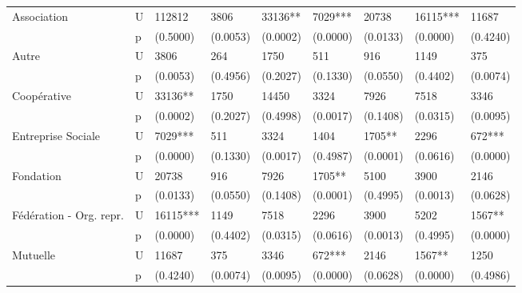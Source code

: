 \begin{table}
\begin{tabularx}{\linewidth}{|l|K{0.4cm}|L|L|L|L|L|L|L|}
                Association			&U&	112812	&   	3806	&	33136**	&	7029***	&	20738	&	16115***&	11687\\
                					&p&	(0.5000)&   	(0.0053)&	(0.0002)&	(0.0000)&	(0.0133)&	(0.0000)&	(0.4240)\\ \hline
                Autre				&U&	3806	&   	264	&       1750&		511		&	916		&	1149	&	375     \\
                					&p&	(0.0053)&   	(0.4956)&	(0.2027)&	(0.1330)&	(0.0550)&	(0.4402)&	(0.0074)\\ \hline
                Coopérative			&U&	33136**	&   	1750	&	14450	&	3324	&	7926	&	7518	&	3346\\
                					&p&	(0.0002)&   	(0.2027)&	(0.4998)&	(0.0017)&	(0.1408)&	(0.0315)&	(0.0095)\\ \hline
                Entreprise Sociale	&U&	7029***	&   	511		&	3324	&	1404	&	1705**	&	2296	&	672***\\
                					&p&	(0.0000)&   	(0.1330)&	(0.0017)&	(0.4987)&	(0.0001)&	(0.0616)&	(0.0000)\\ \hline
                Fondation			&U&	20738	&   	916		&	7926	&	1705**	&	5100	&	3900	&	2146\\
                					&p&	(0.0133)&   	(0.0550)&	(0.1408)&	(0.0001)&	(0.4995)&	(0.0013)&	(0.0628)\\ \hline
                Fédération - Org. repr.			&U&	16115***&   	1149	&	7518	&	2296	&	3900	&	5202	&	1567**\\
                					&p&	(0.0000)&   	(0.4402)&	(0.0315)&	(0.0616)&	(0.0013)&	(0.4995)&	(0.0000)\\ \hline
                Mutuelle			&U&	11687	&   	375		&	3346	&	672***	&	2146	&	1567**	&	1250\\
                					&p&	(0.4240)&   	(0.0074)&	(0.0095)&	(0.0000)&	(0.0628)&	(0.0000)&	(0.4986)\\ \hline


            \end{tabularx}
        \end{table}



